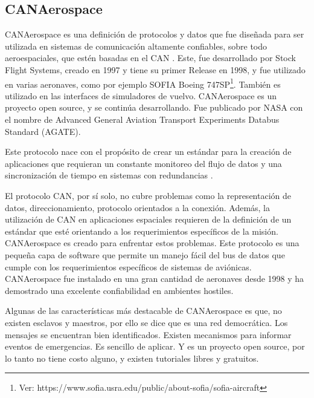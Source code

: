 \subsection{CANAerospace}\label{subsec:CANaerospace}
CANAerospace es una definición de protocolos y datos que fue diseñada
para ser utilizada en sistemas de comunicación altamente confiables,
sobre todo aeroespaciales, que estén basadas en el \ac{CAN}
\citep{CANAerospaceWEB}. Este, fue desarrollado por Stock Flight Systems,
creado en 1997 y tiene su primer Release en 1998, y fue utilizado en varias aeronaves,
como por ejemplo SOFIA Boeing 747SP\footnote{Ver: https://www.sofia.usra.edu/public/about-sofia/sofia-aircraft}.
También es utilizado en las interfaces de simuladores de vuelvo. 
CANAerospace es un proyecto open source, y se continúa desarrollando. Fue
publicado por NASA con el nombre de Advanced General Aviation Transport
Experiments Databus Standard (AGATE).

Este protocolo nace con el propósito de crear un estándar para la creación
de aplicaciones que requieran un constante monitoreo del flujo de datos y una
sincronización de tiempo en sistemas con redundancias \citep{CANAerospaceWEB}.


El protocolo CAN, por sí solo, no cubre problemas como la representación de datos,
direccionamiento, protocolo orientados a la conexión. Además, la utilización de CAN
en aplicaciones espaciales requieren de la definición de un estándar que esté
orientando a los requerimientos específicos de la misión. CANAerospace es creado
para enfrentar estos problemas. Este protocolo es una pequeña capa de software
que permite un manejo fácil del bus de datos que cumple con los requerimientos
específicos de sistemas de aviónicas. CANAerospace fue instalado en una gran cantidad
de aeronaves desde 1998 y ha demostrado  una excelente confiabilidad en
ambientes hostiles.

Algunas de las características más destacable de CANAerospace es que, no existen
esclavos y maestros, por ello se dice que es una red democrática. Los mensajes
se encuentran bien identificados. Existen mecanismos para informar eventos de
emergencias. Es sencillo de aplicar. Y  es un proyecto open source, por lo tanto
no tiene costo alguno, y existen tutoriales libres y gratuitos.

